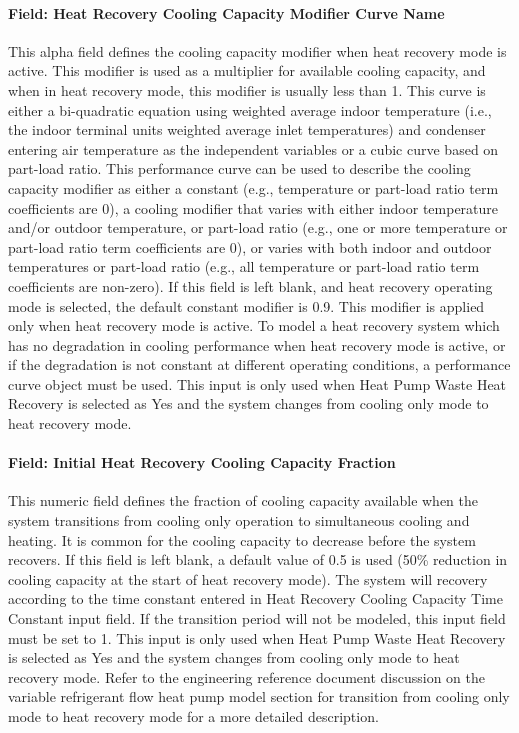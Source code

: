 \paragraph{Field: Heat Recovery Cooling Capacity Modifier Curve Name}\label{field-heat-recovery-cooling-capacity-modifier-curve-name}

This alpha field defines the cooling capacity modifier when heat recovery mode is active. This modifier is used as a multiplier for available cooling capacity, and when in heat recovery mode, this modifier is usually less than 1. This curve is either a bi-quadratic equation using weighted average indoor temperature (i.e., the indoor terminal units weighted average inlet temperatures) and condenser entering air temperature as the independent variables or a cubic curve based on part-load ratio. This performance curve can be used to describe the cooling capacity modifier as either a constant (e.g., temperature or part-load ratio term coefficients are 0), a cooling modifier that varies with either indoor temperature and/or outdoor temperature, or part-load ratio (e.g., one or more temperature or part-load ratio term coefficients are 0), or varies with both indoor and outdoor temperatures or part-load ratio (e.g., all temperature or part-load ratio term coefficients are non-zero). If this field is left blank, and heat recovery operating mode is selected, the default constant modifier is 0.9. This modifier is applied only when heat recovery mode is active. To model a heat recovery system which has no degradation in cooling performance when heat recovery mode is active, or if the degradation is not constant at different operating conditions, a performance curve object must be used. This input is only used when Heat Pump Waste Heat Recovery is selected as Yes and the system changes from cooling only mode to heat recovery mode.

\paragraph{Field: Initial Heat Recovery Cooling Capacity Fraction}\label{field-initial-heat-recovery-cooling-capacity-fraction}

This numeric field defines the fraction of cooling capacity available when the system transitions from cooling only operation to simultaneous cooling and heating. It is common for the cooling capacity to decrease before the system recovers. If this field is left blank, a default value of 0.5 is used (50\% reduction in cooling capacity at the start of heat recovery mode). The system will recovery according to the time constant entered in Heat Recovery Cooling Capacity Time Constant input field. If the transition period will not be modeled, this input field must be set to 1. This input is only used when Heat Pump Waste Heat Recovery is selected as Yes and the system changes from cooling only mode to heat recovery mode. Refer to the engineering reference document discussion on the variable refrigerant flow heat pump model section for transition from cooling only mode to heat recovery mode for a more detailed description.

